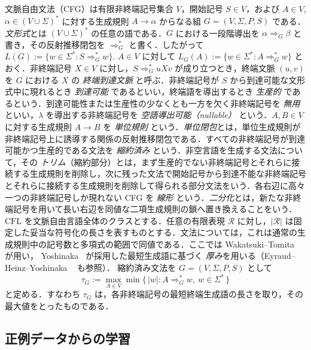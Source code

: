 \documentclass[11pt,a4paper]{ltjsarticle}
\theoremstyle{remark}
\theoremstyle{plain}
\begin{document}
文脈自由文法（CFG）は有限非終端記号集合 $V$，開始記号 $S\in V$，および $A\in V$, $\alpha\in(V\cup\Sigma)^*$ に対する生成規則 $A\to\alpha$ からなる組 $G=(V,\Sigma,P,S)$ である．\emph{文形式}とは $(V\cup\Sigma)^*$ の任意の語である．$G$ における一段階導出を $\alpha\Rightarrow_G\beta$ と書き，その反射推移閉包を $\Rightarrow_G^*$ と書く．したがって
$L(G):=\{w\in\Sigma^*:S\Rightarrow_G^*w\}$.
$A\in V$ に対して
$L_G(A):=\{w\in\Sigma^*:A\Rightarrow_G^*w\}$
とおく．非終端記号 $X\in V$ に対し，$S\Rightarrow_G^*uXv$ が成り立つとき，終端文脈 $(u,v)$ を $G$ における $X$ の \emph{終端到達文脈} と呼ぶ．非終端記号が $S$ から到達可能な文形式中に現れるとき \emph{到達可能} であるといい，終端語を導出するとき \emph{生産的} であるという．到達可能性または生産性の少なくとも一方を欠く非終端記号を \emph{無用} といい，$\lambda$ を導出する非終端記号を \emph{空語導出可能（nullable）} という．$A,B\in V$ に対する生成規則 $A\to B$ を \emph{単位規則} という．\emph{単位閉包}とは，単位生成規則が非終端記号上に誘導する関係の反射推移閉包である．すべての非終端記号が到達可能かつ生産的である文法を \emph{縮約済み} という．非空言語を生成する文法について，その \emph{トリム}（縮約部分）とは，まず生産的でない非終端記号とそれらに接続する生成規則を削除し，次に残った文法で開始記号から到達不能な非終端記号とそれらに接続する生成規則を削除して得られる部分文法をいう．各右辺に高々一つの非終端記号しか現れない CFG を \emph{線形} という．\emph{二分化}とは，新たな非終端記号を用いて長い右辺を同値な二項生成規則の鎖へ置き換えることをいう．
$\mathrm{CFL}$ を文脈自由言語全体のクラスとする．任意の有限表現 $\mathcal R$ に対し，$|\mathcal R|$ は固定した妥当な符号化の長さを表すものとする．文法については，これは通常の生成規則中の記号数と多項式の範囲で同値である．ここでは Wakatsuki--Tomita~\cite{wakatsuki-tomita1993} が用い，
Yoshinaka~\cite{yoshinaka2008} が採用した最短生成語に基づく
\emph{厚み}を用いる（Eyraud--Heinz--Yoshinaka
~\cite[Definition~2.11]{eyraud-heinz-yoshinaka2016} も参照）．
縮約済み文法を $G=(V,\Sigma,P,S)$ として
\[
 \tau_G:=\max_{A\in V}\min\{\,|w|:A\Rightarrow_G^*w,\ w\in\Sigma^*\,\}
\]
と定める．すなわち $\tau_G$ は，各非終端記号の最短終端生成語の長さを取り，その最大値をとったものである．

\subsection{正例データからの学習}\label{sec:learning}
\end{document}
